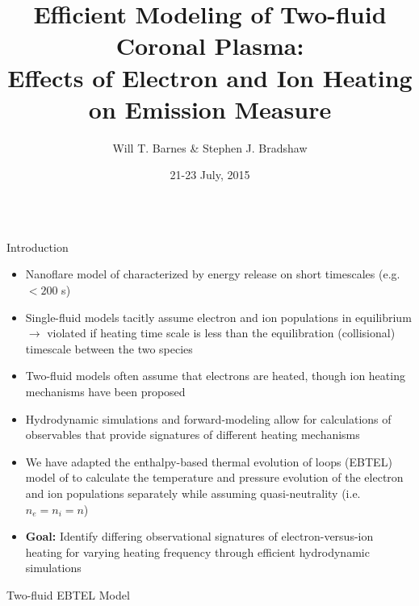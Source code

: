\documentclass[final]{beamer}
\title[Two-fluid Effects and EM]{Efficient Modeling of Two-fluid Coronal Plasma:\\Effects of Electron and Ion Heating on Emission Measure}
\author[Barnes \& Bradshaw]{Will T. Barnes \& Stephen J. Bradshaw}
\institute[Rice University]{Department of Physics and Astronomy, Rice University}
\date{21-23 July, 2015}
\begin{document}
\begin{frame}
	\begin{columns}[t]
		\hfill
		\begin{column}{0.49\linewidth}
			\begin{block}{Introduction}
				\begin{itemize}
					\item Nanoflare model of \citet{parker_nanoflares_1988} characterized by energy release on short timescales (e.g. $<200$ s)
					\item Single-fluid models tacitly assume electron and ion populations in equilibrium $\rightarrow$ violated if heating time scale is less than the equilibration (collisional) timescale between the two species
					\item Two-fluid models often assume that electrons are heated, though ion heating mechanisms have been proposed \citep[see][]{markovskii_intermittent_2004}
					\item Hydrodynamic simulations and forward-modeling allow for calculations of observables that provide signatures of different heating mechanisms
					\item We have adapted the enthalpy-based thermal evolution of loops (EBTEL) model of \citet{klimchuk_highly_2008,cargill_enthalpy-based_2012,cargill_enthalpy-based_2012-1} to calculate the \alert{temperature and pressure evolution of the electron and ion populations separately} while assuming quasi-neutrality (i.e. $n_e=n_i=n$)
					\item \textbf{Goal:} Identify differing observational signatures of \alert{electron-versus-ion heating for varying heating frequency} through efficient hydrodynamic simulations
				\end{itemize}
			\end{block}
			\begin{block}{Two-fluid EBTEL Model}
				\begin{itemize}
					\setlength\itemsep{1em}

\end{itemize}
\end{block}
\end{column}
\end{columns}
\end{frame}
\end{document}

